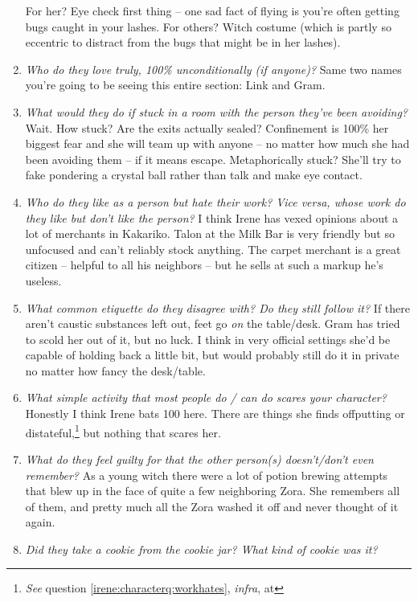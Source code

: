 \begin{enumerate}
      For her? Eye check first thing -- one sad fact of flying is you're often getting bugs caught in your lashes. For others? Witch costume (which is partly so eccentric to distract from the bugs that might be in her lashes).
    \item \textit{Who do they love truly, 100\% unconditionally (if anyone)?}
      Same two names you're going to be seeing this entire section: Link and Gram.
    \item \textit{What would they do if stuck in a room with the person they’ve been avoiding?}
      Wait. How stuck? Are the exits actually sealed? Confinement is 100\% her biggest fear and she will team up with anyone -- no matter how much she had been avoiding them -- if it means escape. Metaphorically stuck? She'll try to fake pondering a crystal ball rather than talk and make eye contact.
    \item \textit{Who do they like as a person but hate their work? Vice versa, whose work do they like but don’t like the person?}
      I think Irene has vexed opinions about a lot of merchants in Kakariko. Talon at the Milk Bar is very friendly but so unfocused and can't reliably stock anything. The carpet merchant is a great citizen -- helpful to all his neighbors -- but he sells at such a markup he's useless. 
    \item \textit{What common etiquette do they disagree with? Do they still follow it?}
      If there aren't caustic substances left out, feet go \emph{on} the table/desk. Gram has tried to scold her out of it, but no luck. I think in very official settings she'd be capable of holding back a little bit, but would probably still do it in private no matter how fancy the desk/table.
    \item \textit{What simple activity that most people do / can do scares your character?}
      Honestly I think Irene bats 100 here. There are things she finds offputting or distateful,\footnote{\textit{See} question \ref{irene:characterq:workhates}, \textit{infra}, at \pageref{irene:characterq:workhates}} but nothing that scares her.
    \item \textit{What do they feel guilty for that the other person(s) doesn’t/don’t even remember?}
      As a young witch there were a lot of potion brewing attempts that blew up in the face of quite a few neighboring Zora. She remembers all of them, and pretty much all the Zora washed it off and never thought of it again.
    \item \textit{Did they take a cookie from the cookie jar? What kind of cookie was it?}

\end{enumerate}
